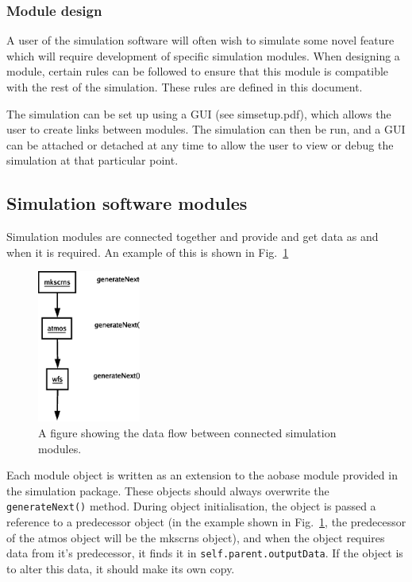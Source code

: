 \documentclass{article}
\begin{document}
\subsubsection{Module design}
A user of the simulation software will often wish to simulate some
novel feature which will require development of specific simulation
modules.  When designing a module, certain rules can be followed to
ensure that this module is compatible with the rest of the simulation.
These rules are defined in this document.

The simulation can be set up using a GUI (see simsetup.pdf), which
allows the user to create links between modules.  The simulation can
then be run, and a GUI can be attached or detached at any time to
allow the user to view or debug the simulation at that particular
point.

\subsection{Simulation software modules}
Simulation modules are connected together and provide and get data
as and when it is required.  An example of this is shown in
Fig.~\ref{fig:modules}

\begin{figure}
\includegraphics[height=5cm]{pics/example.eps}
\caption{A figure showing the data flow between connected simulation
  modules.}
\label{fig:modules}
\end{figure}

Each module object is written as an extension to the aobase module
provided in the simulation package.  These objects should always
overwrite the \texttt{generateNext()} method.  During object
initialisation, the object is passed a reference to a predecessor
object (in the example shown in Fig.~\ref{fig:modules}, the
predecessor of the atmos object will be the mkscrns object), and when
the object requires data from it's predecessor, it finds it in
\texttt{self.parent.outputData}.  If the object is to alter this data,
it should make its own copy. 
\end{document}
